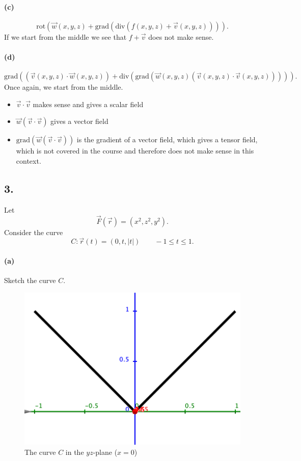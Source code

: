 \paragraph{(c)}
\[ 
\mathrm{rot}\left( \Vec{w}\left( x,y,z \right) + \mathrm{grad}\left( \mathrm{div}\left( f \left( x,y,z \right) + \Vec{v}\left( x,y,z \right)  \right)  \right)  \right) 
.\]
\bigbreak
If we start from the middle we see that $f + \Vec{v}$ does not make sense.

\paragraph{(d)}
\[ 
\mathrm{grad} \left( \left( \Vec{v}\left( x,y,z \right) \cdot \Vec{w}\left( x,y,z \right)  \right) + \mathrm{div}\left( \mathrm{grad}\left( \Vec{w}\left( x,y,z \right) \left( \Vec{v}\left( x,y,z \right) \cdot \Vec{v}\left( x,y,z \right)  \right)  \right)  \right)  \right) 
.\]
\bigbreak
Once again, we start from the middle.
\begin{itemize}
  \item $\Vec{v} \cdot \Vec{v}$ makes sense and gives a scalar field
  \item $\Vec{w}\left( \Vec{v}\cdot \Vec{v} \right)$ gives a vector field
  \item $\mathrm{grad}\left( \Vec{w}\left( \Vec{v}\cdot \Vec{v} \right) \right) $ is the gradient of a vector field, which gives a tensor field, which is not covered in the course and therefore does not make sense in this context.
\end{itemize}


\subsection*{3.} Let
\[ 
\Vec{F} \left( \Vec{r} \right) = \left( x^2, z^2, y^2 \right) 
.\]
Consider the curve
\[ 
C: \Vec{r}(t) = \left( 0,t, |t| \right) \qquad -1 \leq t \leq 1
.\]

\paragraph{(a)} Sketch the curve $C$.
\bigbreak
\begin{figure} [ht]
  \centering
  \includegraphics[width=0.5\linewidth]{./figures/f24_1.png}
  \caption{The curve $C$ in the $yz$-plane ($x=0$)}
  \label{fig:f24_1}
\end{figure}

